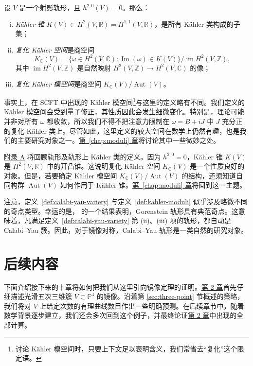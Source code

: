 \begin{definition}\label{def:kahler-moduli}
设 $V$ 是一个射影轨形，且 $h^{2,0}(V)=0$。那么：
\begin{enumerate}[(i)]
\item \emph{Kähler 锥} $K(V)\subset H^2(V,\mathbb R)=H^{1,1}(V,\mathbb R)$，是所有 Kähler 类构成的子集；
\item \emph{复化 Kähler 空间}是商空间
\[
K_{\mathbb C}(V)=\{\omega\in H^2(V,\mathbb C):\operatorname{Im}(\omega)\in K(V)\}/\operatorname{im}H^2(V,\mathbb Z),
\]
其中 $\operatorname{im}H^2(V,\mathbb Z)$ 是自然映射 $H^2(V,\mathbb Z)\to H^2(V,\mathbb C)$ 的像；
\item \emph{复化 Kähler 模空间}是商空间 $K_{\mathbb C}(V)/\operatorname{Aut}(V)$。
\end{enumerate}
\end{definition}
事实上，在 SCFT 中出现的 Kähler 模空间\footnote{讨论 Kähler 模空间时，只要上下文足以表明含义，我们常省去“复化”这个限定语。}与这里的定义略有不同。我们定义的 Kähler 模空间会受到量子修正，其性质因此会发生细微变化。特别是，理论可能并非对所有 $\omega$ 都收敛，所以我们不得不把注意力限制在 $\omega=B+iJ$ 中 $J$ 充分正的复化 Kähler 类上。尽管如此，这里定义的较大空间在数学上仍然有趣，也是我们的主要研究对象之一。\hyperref[chap:moduli]{第~\ref*{chap:moduli} 章}将讨论其中一些微妙之处。

\hyperref[app:singular-varieties]{附录 A} 将回顾轨形及轨形上 Kähler 类的定义。因为 $h^{2,0}=0$，Kähler 锥 $K(V)$ 是 $H^2(V,\mathbb R)$ 中的开凸锥。这说明复化 Kähler 空间 $K_{\mathbb C}(V)$ 是一个性质良好的对象。但是，若要确定 Kähler 模空间 $K_{\mathbb C}(V)/\operatorname{Aut}(V)$ 的结构，还须知道自同构群 $\operatorname{Aut}(V)$ 如何作用于 Kähler 锥。\hyperref[chap:moduli]{第~\ref*{chap:moduli} 章}将回到这一主题。

注意，定义~\ref{def:calabi-yau-variety} 与定义~\ref{def:kahler-moduli} 似乎涉及略微不同的奇点类型。幸运的是， 的一个结果表明，Gorenstein 轨形具有典范奇点。这意味着，凡满足定义~\ref{def:calabi-yau-variety} 第 (ii)、(iii) 项的轨形，都自动是 Calabi--Yau 簇。因此，对于镜像对称，Calabi--Yau 轨形是一类自然的研究对象。

\section{后续内容}\label{sec:whats-next}

下面介绍接下来的十章将如何把我们从这里引向镜像定理的证明。\hyperref[chap:quintic]{第 2 章}首先仔细描述光滑五次三维簇 $V\subset\mathbb P^4$ 的镜像。沿着第 \ref{sec:three-point} 节概述的策略，我们将对 $V$ 上给定次数的有理曲线数目作出一些明确预测。在后续章节中，随着数学背景逐步建立，我们还会多次回到这个例子，并最终论证\hyperref[chap:quintic]{第 2 章}中出现的全部计算。

